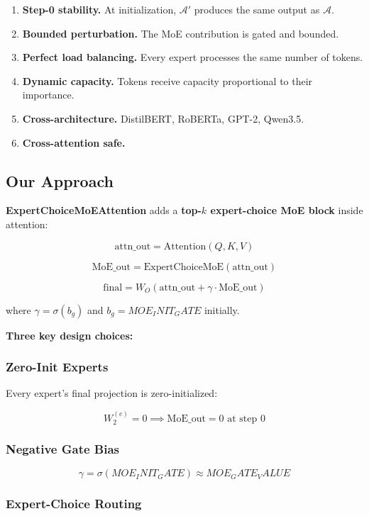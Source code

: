 \begin{enumerate}
\item \textbf{Step-0 stability.} At initialization, $\mathcal{A}'$ produces the
  same output as $\mathcal{A}$.
\item \textbf{Bounded perturbation.} The MoE contribution is gated and bounded.
\item \textbf{Perfect load balancing.} Every expert processes the same number of
  tokens.
\item \textbf{Dynamic capacity.} Tokens receive capacity proportional to their
  importance.
\item \textbf{Cross-architecture.} DistilBERT, RoBERTa, GPT-2, Qwen3.5.
\item \textbf{Cross-attention safe.}

\end{enumerate}
\subsection{Our Approach}

\textbf{ExpertChoiceMoEAttention} adds a \textbf{top-$k$ expert-choice MoE block} 
inside attention:

\[
\text{attn\_out} = \text{Attention}(Q, K, V)
\tag{1.1}
\]

\[
\text{MoE\_out} = \text{ExpertChoiceMoE}(\text{attn\_out})
\tag{1.2}
\]

\[
\text{final} = W_O \left( \text{attn\_out} + \gamma \cdot \text{MoE\_out} \right)
\tag{1.3}
\]

where $\gamma = \sigma(b_g)$ and $b_g = {{MOE_INIT_GATE}}$ initially.

\textbf{Three key design choices:}

\subsubsection{Zero-Init Experts}

Every expert's final projection is zero-initialized:

\[
W_2^{(e)} = 0 \implies \text{MoE\_out} = 0 \text{ at step 0}
\tag{1.4}
\]

\subsubsection{Negative Gate Bias}

\[
\gamma = \sigma({{MOE_INIT_GATE}}) \approx {{MOE_GATE_VALUE}}
\tag{1.5}
\]

\subsubsection{Expert-Choice Routing}

